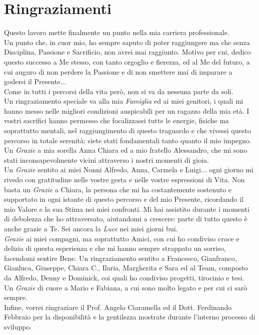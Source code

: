 \chapter*{Ringraziamenti}
\noindent Questo lavoro mette finalmente un punto nella mia carriera professionale.\\
Un punto che, in cuor mio, ho sempre saputo di poter raggiungere ma che senza Disciplina, Passione e Sacrificio, non avrei mai raggiunto. Motivo per cui, dedico questo successo a Me stesso, con tanto orgoglio e fierezza, ed al Me del futuro, a cui auguro di non perdere la Passione e di non smettere mai di imparare a godersi il Presente... \\
Come in tutti i percorsi della vita però, non si va da nessuna parte da soli.\\ Un ringraziamento speciale va alla mia \textit{Famiglia} ed ai miei genitori, i quali mi hanno messo nelle migliori condizioni auspicabili per un ragazzo della mia età. I vostri sacrifici hanno permesso che focalizzassi tutte le energie, fisiche ma soprattutto mentali, nel raggiungimento di questo traguardo e che vivessi questo percorso in totale serenità; siete stati fondamentali tanto quanto il mio impegno. Un \textit{Grazie} a mia sorella Anna Chiara ed a mio fratello Alessandro, che mi sono stati inconsapevolmente vicini attraverso i nostri momenti di gioia.\\
Un \textit{Grazie} sentito ai miei Nonni Alfredo, Anna, Carmela e Luigi... ogni giorno mi rivedo con gratitudine nelle vostre gesta e nelle vostre espressioni di Vita.
Non basta un \textit{Grazie} a Chiara, la persona che mi ha costantemente sostenuto e supportato in ogni istante di questo percorso e del mio Presente, ricordando il mio Valore e la sua Stima nei miei confronti. Mi hai assistito durante i momenti di debolezza che ho attraversato, aiutandomi a crescere: parte di tutto questo è anche grazie a Te. Sei ancora la \textit{Luce} nei miei giorni bui.\\
\textit{Grazie} ai miei compagni, ma soprattutto Amici, con cui ho condiviso croce e delizia di questa esperienza e che mi hanno sempre strappato un sorriso, facendomi sentire Bene. Un ringraziamento sentito a Francesco, Gianfranco, Gianluca, Giuseppe, Chiara C., Ilaria, Margherita e Sara ed al Team, composto da Alfredo, Denny e Dominick, coi quali ho condiviso progetti, tirocinio e tesi.\\
Un \textit{Grazie} di cuore a Mario e Fabiana, a cui sono molto legato e per cui ci sarò sempre.\\
Infine, vorrei ringraziare il Prof. Angelo Ciaramella ed il Dott. Ferdinando Febbraio per la disponibilità e la gentilezza mostrate durante l'interno processo di sviluppo. 
